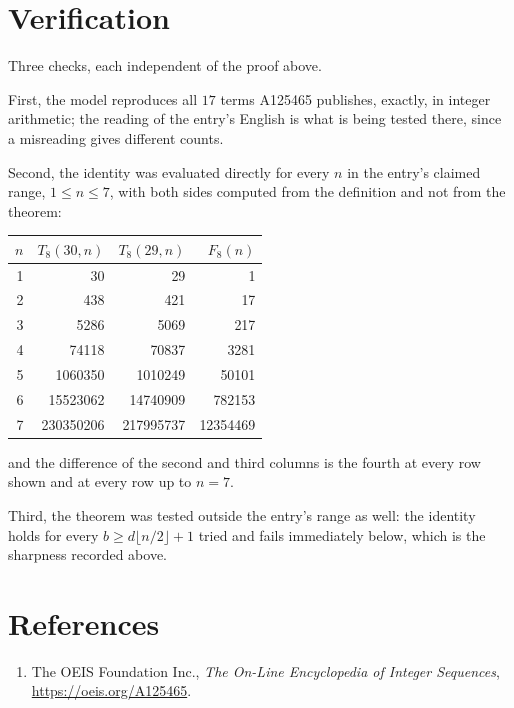 \documentclass[11pt,a4paper]{article}
\theoremstyle{plain}
\theoremstyle{definition}
\begin{document}
\section{Verification}

Three checks, each independent of the proof above.

First, the model reproduces all $17$ terms A125465 publishes, exactly, in integer
arithmetic; the reading of the entry's English is what is being tested there, since a
misreading gives different counts.

Second, the identity was evaluated directly for every $n$ in the entry's claimed range,
$1\le n\le7$, with both sides computed from the definition and not from the theorem:

\begin{center}
\begin{tabular}{rrrr}
$n$ & $T_{8}(30,n)$ & $T_{8}(29,n)$ & $F_{8}(n)$ \\ \hline
1 & 30 & 29 & 1 \\
2 & 438 & 421 & 17 \\
3 & 5286 & 5069 & 217 \\
4 & 74118 & 70837 & 3281 \\
5 & 1060350 & 1010249 & 50101 \\
6 & 15523062 & 14740909 & 782153 \\
7 & 230350206 & 217995737 & 12354469 \\
\end{tabular}
\end{center}

\noindent and the difference of the second and third columns is the fourth at every row shown
and at every row up to $n=7$.

Third, the theorem was tested outside the entry's range as well: the identity holds for every
$b\ge d\lfloor n/2\rfloor+1$ tried and fails immediately below, which is the sharpness recorded
above.

\section*{References}
\begin{enumerate}
\item The OEIS Foundation Inc., \emph{The On-Line Encyclopedia of Integer Sequences},
\url{https://oeis.org/A125465}.
\end{enumerate}
\end{document}
